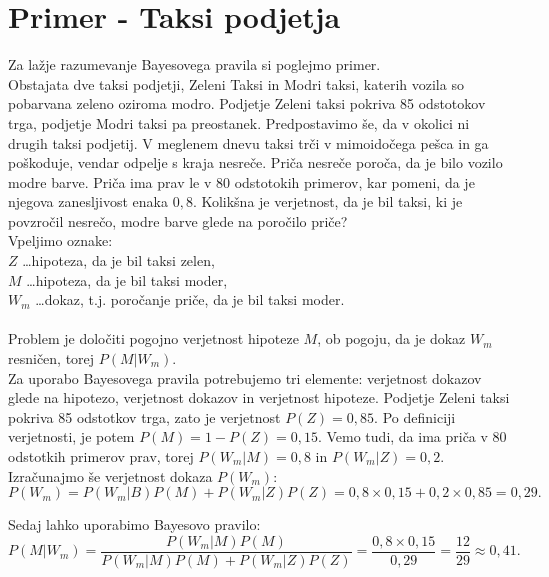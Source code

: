 \documentclass[12pt,a4paper]{amsart}
\theoremstyle{definition} %
\theoremstyle{plain} %
\begin{document}
\section{Primer - Taksi podjetja}
Za lažje razumevanje Bayesovega pravila si poglejmo primer. \\

Obstajata dve taksi podjetji, Zeleni Taksi in Modri taksi, katerih vozila so pobarvana zeleno oziroma modro. Podjetje Zeleni taksi pokriva 
85 odstotokov trga, podjetje Modri taksi pa preostanek. Predpostavimo še, da v okolici ni drugih taksi podjetij. V meglenem dnevu taksi trči 
v mimoidočega pešca in ga poškoduje, vendar odpelje s kraja nesreče. Priča nesreče poroča, da je bilo vozilo modre barve. Priča ima prav le 
v 80 odstotokih primerov, kar pomeni, da je njegova zanesljivost enaka $0,8$. Kolikšna je verjetnost, da je bil taksi, ki je povzročil nesrečo, 
modre barve glede na poročilo priče? \\

Vpeljimo oznake:\\
$Z$ \dots hipoteza, da je bil taksi zelen, \\
$M$ \dots hipoteza, da je bil taksi moder, \\
$W_m$ \dots dokaz, t.j. poročanje priče, da je bil taksi moder. \\ \\
Problem je določiti pogojno verjetnost hipoteze $M$, ob pogoju, da je dokaz $W_m$ resničen, torej $P(M \lvert W_m)$. \\

Za uporabo Bayesovega pravila potrebujemo tri elemente: verjetnost dokazov glede na hipotezo, verjetnost dokazov in verjetnost hipoteze. Podjetje 
Zeleni taksi pokriva 85 odstotkov trga, zato je verjetnost $P(Z)=0,85$. Po definiciji verjetnosti, je potem $P(M)=1-P(Z)=0,15$. Vemo tudi, da ima 
priča v 80 odstotkih primerov prav, torej $P(W_m \lvert M) = 0,8$ in $P(W_m \lvert Z) = 0,2$. Izračunajmo še verjetnost dokaza $P(W_m)$:
\[P(W_m) = P(W_m \lvert B)P(M) + P(W_m \lvert Z)P(Z)= 0,8 \times 0,15 + 0,2 \times 0,85 = 0,29.\]

Sedaj lahko uporabimo Bayesovo pravilo:
\[P(M \lvert W_m)= \frac{P(W_m \lvert M)P(M)}{P(W_m \lvert M)P(M) + P(W_m \lvert Z)P(Z)} = \frac{0,8 \times 0,15}{0,29} = \frac{12}{29} \approx 0,41.\]
\end{document}
